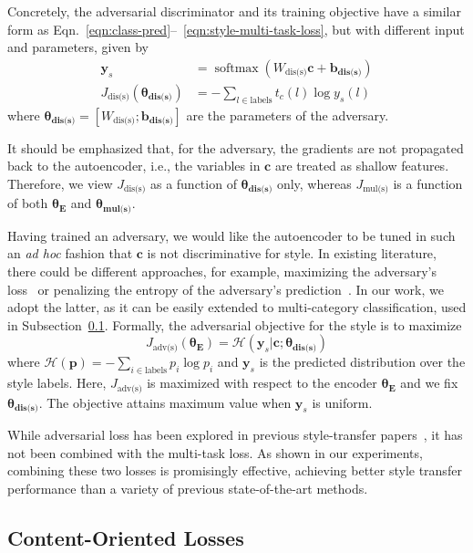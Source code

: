 \documentclass[11pt,a4paper]{article}
\newcommand{\loss}[1]{J_{\text{#1}}}
\newcommand{\nnweight}[1]{\bm{\theta_{\text{#1}}}}
\newcommand{\weight}[1]{W_{\text{#1}}}
\newcommand{\bias}[1]{\bm{b_{\text{#1}}}}
\begin{document}
Concretely, the adversarial discriminator and its training objective have a similar form as Eqn.~\ref{eqn:class-pred}--~\ref{eqn:style-multi-task-loss}, but with different input and parameters, given by
\begin{align}
	\label{eqn:adv-disc-loss}
	\bm y_s                          & = \operatorname{softmax}(\weight{dis(s)} \bm c + \bias{dis(s)}) \\
	\loss{dis(s)}(\nnweight{dis(s)}) & = - \sum\nolimits_{l\in\text{labels}} t_c(l)\log y_s(l)
\end{align}
where $\nnweight{dis(s)}=[\weight{dis(s)}; \bias{dis(s)}]$ are the parameters of the adversary.

It should be emphasized that, for the adversary, the gradients are not propagated back to the autoencoder, i.e., the variables in $\bm c$ are treated as shallow features. Therefore, we view $\loss{dis(s)}$ as a function of $\nnweight{dis(s)}$ only, whereas $\loss{mul(s)}$ is a function of both $\nnweight{E}$ and $\nnweight{mul(s)}$.

Having trained an adversary, we would like the autoencoder to be tuned in such an \textit{ad hoc} fashion that $\bm c$ is not discriminative for style.
In existing literature, there could be different approaches, for example, maximizing the adversary's loss~\cite{shen2017style,zhao2018adversarially} or penalizing the entropy of the adversary's prediction~\cite{fu2018style}.
In our work, we adopt the latter, as it can be easily extended to multi-category classification, used in Subsection~\ref{ss:content}. Formally, the adversarial objective for the style is to maximize
\begin{equation} \label{eqn:advs}
	\loss{adv(s)}(\nnweight{E})=\mathcal{H}(\bm y_s|\bm c; \nnweight{dis(s)})
\end{equation}
where $\mathcal{H}(\bm p)=-\sum_{i\in\text{labels}}p_i\log p_i$ and $\bm y_s$ is the predicted distribution over the style labels. Here, $\loss{adv(s)}$ is maximized with respect to the encoder $\nnweight{E}$ and we fix $\nnweight{dis(s)}$. The objective attains maximum value when $\bm y_s$ is uniform.

While adversarial loss has been explored in previous style-transfer papers~\cite{shen2017style,fu2018style}, it has not been combined with the multi-task loss. As shown in our experiments, combining these two losses is promisingly effective, achieving better style transfer performance than a variety of previous state-of-the-art methods.

\subsection{Content-Oriented Losses}\label{ss:content}
\end{document}
